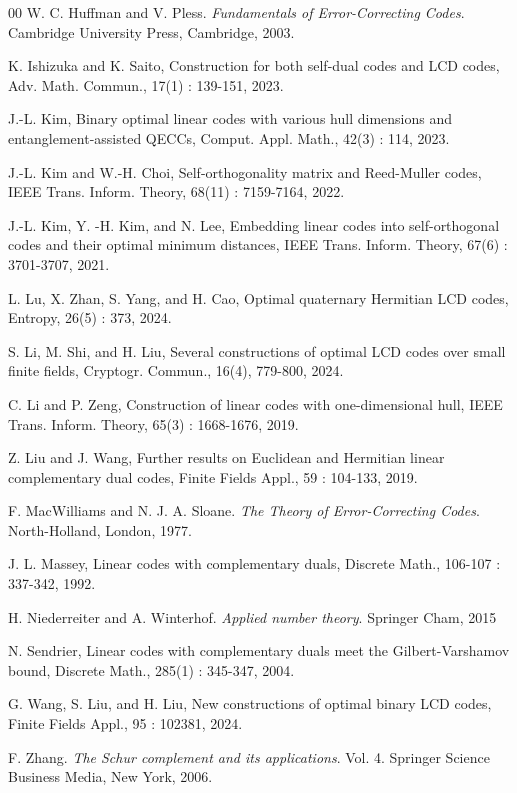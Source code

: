 \documentclass{article}
\theoremstyle{definition}
\theoremstyle{remark}
\begin{document}
\begin{thebibliography}{00}
     W. C. Huffman and V. Pless. \textit{Fundamentals of Error-Correcting Codes}. Cambridge University Press, Cambridge, 2003.

     K. Ishizuka and K. Saito, Construction for both self-dual codes and LCD codes, Adv. Math. Commun., 17(1) : 139-151, 2023.

     J.-L. Kim, Binary optimal linear codes with various hull dimensions and entanglement-assisted QECCs, Comput. Appl. Math., 42(3) : 114, 2023.

     J.-L. Kim and W.-H. Choi, Self-orthogonality matrix and Reed-Muller codes, IEEE Trans. Inform. Theory, 68(11) : 7159-7164, 2022.

     J.-L. Kim, Y. -H. Kim, and N. Lee, Embedding linear codes into self-orthogonal codes and their optimal minimum distances, IEEE Trans. Inform. Theory, 67(6) : 3701-3707, 2021.

     L. Lu, X. Zhan, S. Yang, and H. Cao, Optimal quaternary Hermitian LCD codes, Entropy, 26(5) : 373, 2024.

     S. Li, M. Shi, and H. Liu, Several constructions of optimal LCD codes over small finite fields, Cryptogr. Commun., 16(4), 779-800, 2024.

     C. Li and P. Zeng, Construction of linear codes with one-dimensional hull, IEEE Trans. Inform. Theory, 65(3) : 1668-1676, 2019.

     Z. Liu and J. Wang, Further results on Euclidean and Hermitian linear complementary dual codes, Finite Fields Appl., 59 : 104-133, 2019.

     F. MacWilliams and N. J. A. Sloane. \textit{The Theory of Error-Correcting Codes}. North-Holland, London, 1977.

     J. L. Massey, Linear codes with complementary duals, Discrete Math., 106-107 : 337-342, 1992.

     H. Niederreiter and A. Winterhof. \textit{Applied number theory}. Springer Cham, 2015

     N. Sendrier, Linear codes with complementary duals meet the Gilbert-Varshamov bound, Discrete Math., 285(1) : 345-347, 2004.

     G. Wang, S. Liu, and H. Liu, New constructions of optimal binary LCD codes, Finite Fields Appl., 95 : 102381, 2024.

	 F. Zhang. \textit{The Schur complement and its applications}. Vol. 4. Springer Science Business Media, New York, 2006.
\end{thebibliography}
\end{document}

